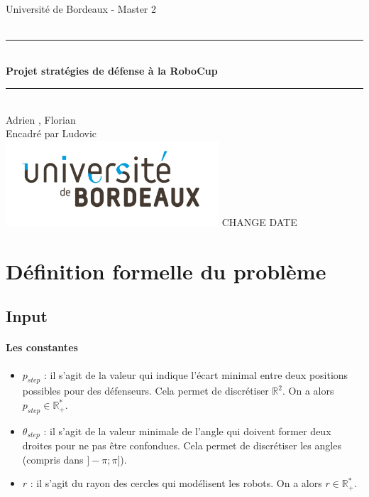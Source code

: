 \documentclass[12pt]{article}
\begin{document}
\begin{titlepage}
    ~ \vfill
    \begin{center}
      \LARGE  Université de Bordeaux - Master 2\\[1.5cm]

      {\Large \bfseries {}}\\[0.5cm]

      \rule{\linewidth}{0.5mm}\\[0.4cm] {\Huge \bfseries Projet stratégies de défense à la RoboCup \\[0.2cm]} \rule{\linewidth}{0.5mm}\\[1.5cm] {
      \Large Adrien , Florian }\\[0.5cm]

                {\large Encadré par Ludovic }\\ \vfill
                \includegraphics[width = 300px]{logo.jpg} \vfill
                                {\large CHANGE DATE}
    \end{center}
\end{titlepage}

\section{Définition formelle du problème}

\subsection{Input}

\paragraph{Les constantes}

\begin{itemize}
  \item $p_{step}$ : il s'agit de la valeur qui indique l'écart minimal entre deux positions possibles pour des défenseurs. Cela permet de discrétiser $\mathbb{R}^2$. On a alors $p_{step} \in \mathbb{R}^*_+$.
  \item $\theta_{step}$ : il s'agit de la valeur minimale de l'angle qui doivent former deux droites pour ne pas être confondues. Cela permet de discrétiser les angles (compris dans $]-\pi ; \pi]$).
  \item $r$ : il s'agit du rayon des cercles qui modélisent les robots. On a alors $r \in \mathbb{R}^*_+$.
\end{itemize}
\end{document}
